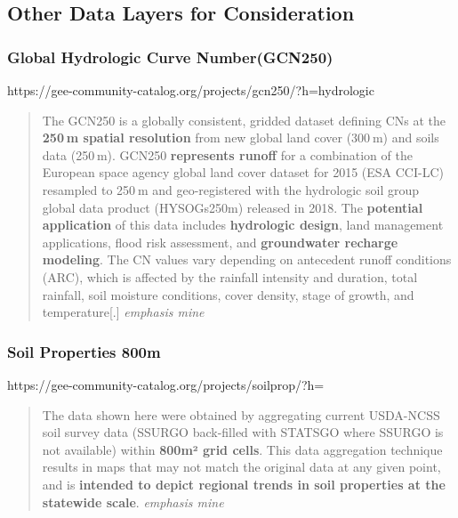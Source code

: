 \documentclass[
]{agujournal2019}
\begin{document}
\subsection{Other Data Layers for
Consideration}\label{other-data-layers-for-consideration}

\subsubsection{Global Hydrologic Curve
Number(GCN250)}\label{global-hydrologic-curve-numbergcn250}

https://gee-community-catalog.org/projects/gcn250/?h=hydrologic

\begin{quote}
The GCN250 is a globally consistent, gridded dataset defining CNs at the
\textbf{250 m spatial resolution} from new global land cover (300 m) and
soils data (250 m). GCN250 \textbf{represents runoff} for a combination
of the European space agency global land cover dataset for 2015 (ESA
CCI-LC) resampled to 250 m and geo-registered with the hydrologic soil
group global data product (HYSOGs250m) released in 2018. The
\textbf{potential application} of this data includes \textbf{hydrologic
design}, land management applications, flood risk assessment, and
\textbf{groundwater recharge modeling}. The CN values vary depending on
antecedent runoff conditions (ARC), which is affected by the rainfall
intensity and duration, total rainfall, soil moisture conditions, cover
density, stage of growth, and temperature{[}.{]} \emph{emphasis mine}
\end{quote}

\subsubsection{Soil Properties 800m}\label{soil-properties-800m}

https://gee-community-catalog.org/projects/soilprop/?h=

\begin{quote}
The data shown here were obtained by aggregating current USDA-NCSS soil
survey data (SSURGO back-filled with STATSGO where SSURGO is not
available) within \textbf{800m² grid cells}. This data aggregation
technique results in maps that may not match the original data at any
given point, and is \textbf{intended to depict regional trends in soil
properties at the statewide scale}. \emph{emphasis mine}
\end{quote}
\end{document}

